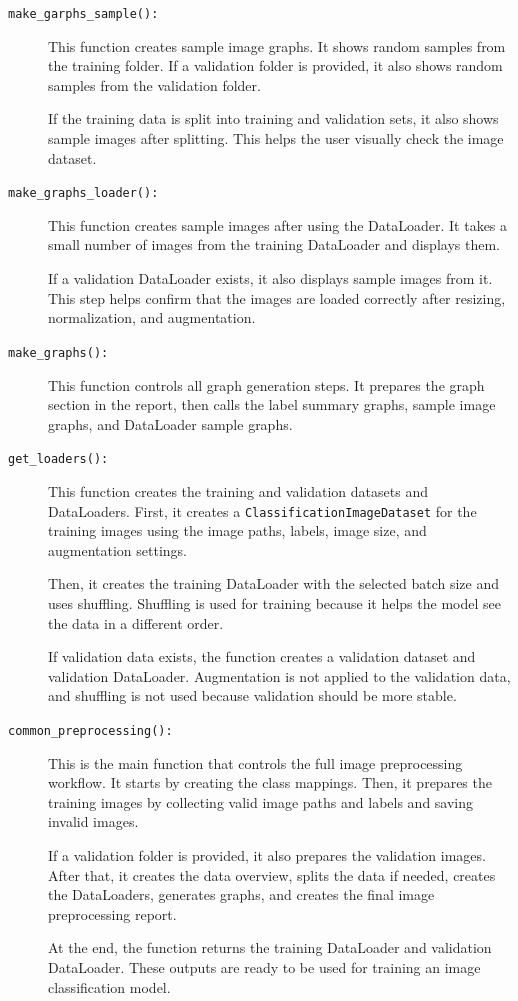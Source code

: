 \documentclass[12pt,a4paper]{report}
\begin{document}
\begin{description}
    \item[\texttt{make\_garphs\_sample():}]
    This function creates sample image graphs. It shows random samples from the training
    folder. If a validation folder is provided, it also shows random samples from the
    validation folder.

    If the training data is split into training and validation sets, it also shows sample
    images after splitting. This helps the user visually check the image dataset.

    \item[\texttt{make\_graphs\_loader():}]
    This function creates sample images after using the DataLoader. It takes a small
    number of images from the training DataLoader and displays them.

    If a validation DataLoader exists, it also displays sample images from it. This step
    helps confirm that the images are loaded correctly after resizing, normalization, and
    augmentation.

    \item[\texttt{make\_graphs():}]
    This function controls all graph generation steps. It prepares the graph section in
    the report, then calls the label summary graphs, sample image graphs, and DataLoader
    sample graphs.

    \item[\texttt{get\_loaders():}]
    This function creates the training and validation datasets and DataLoaders. First, it
    creates a \texttt{ClassificationImageDataset} for the training images using the image
    paths, labels, image size, and augmentation settings.

    Then, it creates the training DataLoader with the selected batch size and uses
    shuffling. Shuffling is used for training because it helps the model see the data in
    a different order.

    If validation data exists, the function creates a validation dataset and validation
    DataLoader. Augmentation is not applied to the validation data, and shuffling is not
    used because validation should be more stable.

    \item[\texttt{common\_preprocessing():}]
    This is the main function that controls the full image preprocessing workflow. It
    starts by creating the class mappings. Then, it prepares the training images by
    collecting valid image paths and labels and saving invalid images.

    If a validation folder is provided, it also prepares the validation images. After
    that, it creates the data overview, splits the data if needed, creates the
    DataLoaders, generates graphs, and creates the final image preprocessing report.

    At the end, the function returns the training DataLoader and validation DataLoader.
    These outputs are ready to be used for training an image classification model.
\end{description}
\end{document}
